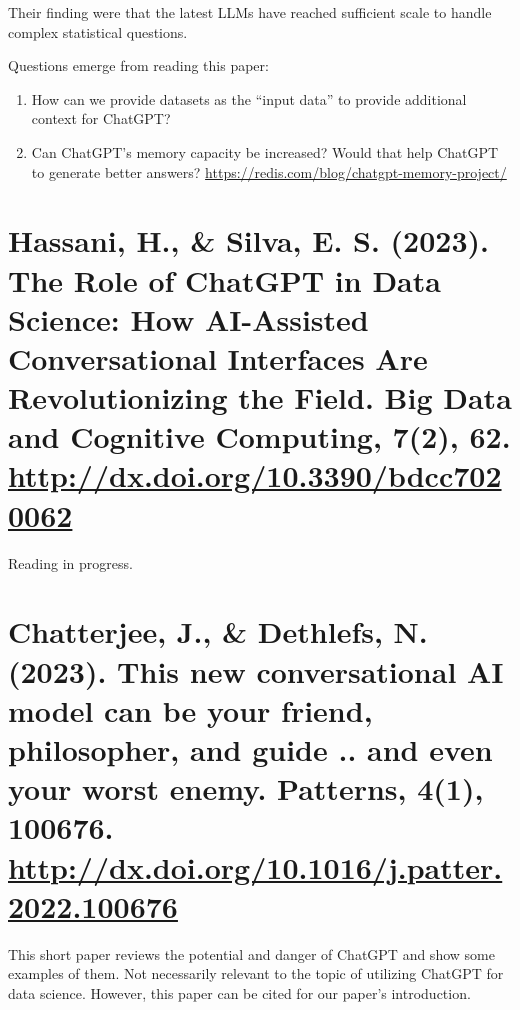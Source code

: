 \documentclass[11pt]{article}
\begin{document}
Their finding were that the latest LLMs have reached sufficient scale to handle
complex statistical questions.

Questions emerge from reading this paper:
\begin{enumerate}
\item How can we provide datasets as the ``input data'' to provide additional context
for ChatGPT?
\item Can ChatGPT's memory capacity be increased? Would that help ChatGPT to
generate better answers? \url{https://redis.com/blog/chatgpt-memory-project/}
\end{enumerate}

\section{Hassani, H., \& Silva, E. S. (2023). The Role of ChatGPT in Data Science: How AI-Assisted Conversational Interfaces Are Revolutionizing the Field. Big Data and Cognitive Computing, 7(2), 62. \url{http://dx.doi.org/10.3390/bdcc7020062}}
\label{sec:org17eee30}
Reading in progress.

\section{Chatterjee, J., \& Dethlefs, N. (2023). This new conversational AI model can be your friend, philosopher, and guide .. and even your worst enemy. Patterns, 4(1), 100676. \url{http://dx.doi.org/10.1016/j.patter.2022.100676}}
\label{sec:orgbb9c93b}
This short paper reviews the potential and danger of ChatGPT and show some
examples of them. Not necessarily relevant to the topic of utilizing ChatGPT for
data science. However, this paper can be cited for our paper's introduction.
\end{document}
